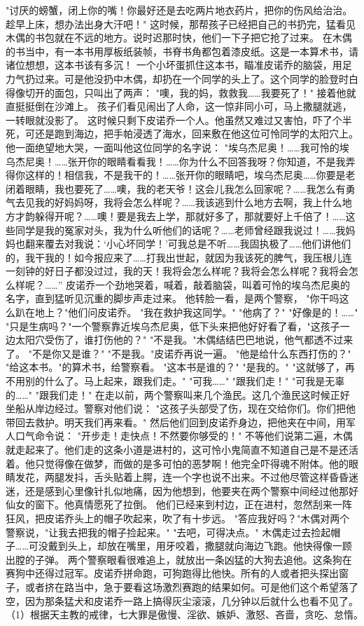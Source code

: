 \documentclass[12pt,UTF8]{ctexbook}
\begin{document}
"讨厌的螃蟹，闭上你的嘴！你最好还是去吃两片地衣药片，把你的伤风给治治。趁早上床，想办法出身大汗吧！"
这时候，那帮孩子已经把自己的书扔完，猛看见木偶的书包就在不远的地方。说时迟那时快，他们一下子把它抢了过来。
在木偶的书当中，有一本书用厚板纸装帧，书脊书角都包着漆皮纸。这是一本算术书，请诸位想想，这本书该有多沉！
一个小坏蛋抓住这本书，瞄准皮诺乔的脑袋，用足力气扔过来。可是他没扔中木偶，却扔在一个同学的头上了。这个同学的脸登时白得像切开的面包，只叫出了两声：
"噢，我的妈，救救我……我要死了！"
接着他就直挺挺倒在沙滩上。
孩子们看见闹出了人命，这一惊非同小可，马上撒腿就逃，一转眼就没影了。
这时候只剩下皮诺乔一个人。他虽然又难过又害怕，吓了个半死，可还是跑到海边，把手帕浸透了海水，回来敷在他这位可怜同学的太阳穴上。他一面绝望地大哭，一面叫他这位同学的名字说：
"埃乌杰尼奥！……我可怜的埃乌杰尼奥！……张开你的眼睛看看我！……你为什么不回答我呀？你知道，不是我弄得你这样的！相信我，不是我干的！……张开你的眼睛吧，埃乌杰尼奥……你要是老闭着眼睛，我也要死了……噢，我的老天爷！这会儿我怎么回家呢？……我怎么有勇气去见我的好妈妈呀，我将会怎么样呢？……我该逃到什么地方去啊，我上什么地方才韵躲得开呢？……噢！要是我去上学，那就好多了，那就要好上千倍了！……这些同学是我的冤家对头，我为什么听他们的话呢？……老师曾经跟我说过！……我妈妈也翻来覆去对我说：‘小心坏同学！’可我总是不听……我固执极了……他们讲他们的，我干我的！如今报应来了……打我出世起，就因为我该死的脾气，我压根儿连一刻钟的好日子都没过过，我的天！我将会怎么样呢？我将会怎么样呢？我将会怎么样呢？……”
皮诺乔一个劲地哭着，喊着，敲着脑袋，叫着可怜的埃乌杰尼奥的名字，直到猛听见沉重的脚步声走过来。
他转脸一看，是两个警察，
"你干吗这么趴在地上？"他们问皮诺乔。
"我在救护我这同学。"
"他病了？"
"好像是的！……"
"只是生病吗？"一个警察靠近埃乌杰尼奥，低下头来把他好好看了看，"这孩子一边太阳穴受伤了，谁打伤他的？"
"不是我。"木偶结结巴巴地说，他气都透不过来了。
"不是你又是谁？"
"不是我。"皮诺乔再说一遍。
"他是给什么东西打伤的？"
"给这本书。"的算术书，给警察看。
"这本书是谁的？"
"是我的。"
"这就够了，再不用别的什么了。马上起来，跟我们走。"
"可我……"
"跟我们走！"
"可我是无辜的……"
"跟我们走！"
在走以前，两个警察叫来几个渔民。这几个渔民这时候正好坐船从岸边经过。警察对他们说：
"这孩子头部受了伤，现在交给你们。你们把他带回去救护。明天我们再来看。"
然后他们回到皮诺乔身边，把他夹在中间，用军人口气命令说：
"开步走！走快点！不然要你够受的！"
不等他们说第二遍，木偶就走起来了。他们走的这条小道是进村的，这可怜小鬼简直不知道自己是不是还活着。他只觉得像在做梦，而做的是多可怕的恶梦啊！他完全吓得魂不附体。他的眼睛发花，两腿发抖，舌头贴着上腭，连一个字也说不出来。不过他尽管这样昏昏迷迷，还是感到心里像针扎似地痛，因为他想到，他要夹在两个警察中间经过他那好仙女的窗下。他真情愿死了拉倒。
他们已经来到村边，正在进村，忽然刮来一阵狂风，把皮诺乔头上的帽子吹起来，吹了有十步远。
"答应我好吗？"木偶对两个警察说，"让我去把我的帽子捡起来。"
"去吧，可得决点。"
木偶走过去捡起帽子……可没戴到头上，却放在嘴里，用牙咬着，撒腿就向海边飞跑。他快得像一顾出膛的子弹。
两个警察眼看很难追上，就放出一条凶猛的大狗去追他。这条狗在赛狗中还得过冠军。皮诺乔拼命跑，可狗跑得比他快。所有的人或者把头探出窗子，或者挤在路当中，急于要看这场激烈赛跑的结果如何。可是他们这个希望落了空，因为那条猛犬和皮诺乔一路上搞得灰尘滚滚，几分钟以后就什么也看不见了。
（1）根据天主教的戒律，七大罪是傲慢、淫欲、嫉妒、激怒、吝啬，贪吃、怠惰。　
\end{document}
